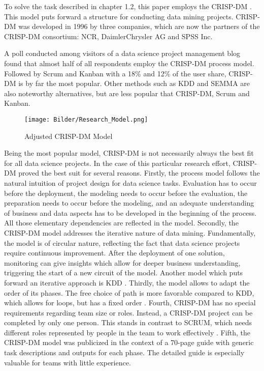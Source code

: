 To solve the task described in chapter 1.2, this paper employs the \ac{CRISP-DM} \cite{CRISPDM2000}. This model puts forward a structure for conducting data mining projects. \ac{CRISP-DM} was developed in 1996 by three companies, which are now the partners of the \ac{CRISP-DM} consortium: NCR, DaimlerChrysler AG and SPSS Inc. 

A poll \cite{CRISPDMPopular2020} conducted among visitors of a data science project management blog found that almost half of all respondents employ the \ac{CRISP-DM} process model. Followed by Scrum and Kanban with a 18\% and 12\% of the user share, \ac{CRISP-DM} is by far the most popular. Other methods such as \ac{KDD} and \ac{SEMMA} are also noteworthy alternatives, but are less popular that CRISP-DM, Scrum and Kanban.

\begin{figure}[ht]
	\centering
	\texttt{[image: Bilder/Research\_Model.png]}
	\caption{Adjusted CRISP-DM Model}
	\label{fig:CRISM-DM}
\end{figure}

Being the most popular model, \ac{CRISP-DM} is not necessarily always the best fit for all data science projects. In the case of this particular research effort, \ac{CRISP-DM} proved the best suit for several reasons.
Firstly, the process model follows the natural intuition of project design for data science tasks. Evaluation has to occur before the deployment, the modeling needs to occur before the evaluation, the preparation needs to occur before the modeling, and an adequate understanding of business and data aspects has to be developed in the beginning of the process. All those elementary dependencies are reflected in the model.
Secondly, the \ac{CRISP-DM} model addresses the iterative nature of data mining. Fundamentally, the model is of circular nature, reflecting the fact that data science projects require continuous improvement. After the deployment of one solution, monitoring can give insights which allow for deeper business understanding, triggering the start of a new circuit of the model. Another model which puts forward an iterative approach is \ac{KDD} \cite{KDD}.
Thirdly, the model allows to adapt the order of its phases. The free choice of path is more favorable compared to \ac{KDD}, which allows for loops, but has a fixed order \cite{KDD}.
Fourth, \ac{CRISP-DM} has no special requirements regarding team size or roles. Instead, a \ac{CRISP-DM} project can be completed by only one person. This stands in contrast to SCRUM, which needs different roles represented by people in the team to work effectively \cite{SCRUMSolo}. 
Fifth, the \ac{CRISP-DM} model was publicized in the context of a 70-page guide with generic task descriptions and outputs for each phase. The detailed guide is especially valuable for teams with little experience.

